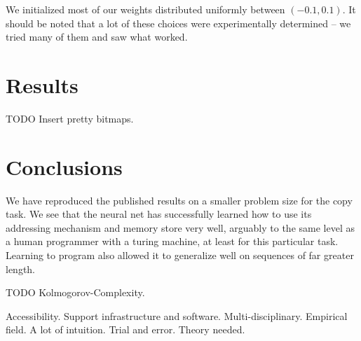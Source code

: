 \documentclass[12pt]{article}
\begin{document}
We initialized most of our weights distributed uniformly between $(-0.1, 0.1)$.
It should be noted that a lot of these choices were experimentally determined -- we 
tried many of them and saw what worked.

\section{Results}\label{results}

TODO Insert pretty bitmaps.

\section{Conclusions}\label{conclusions}

We have reproduced the published results on a smaller problem size for the
copy task. We see that the neural net has successfully learned how to
use its addressing mechanism and memory store very well, arguably to the
same level as a human programmer with a turing machine, at least for this
particular task. Learning to program also allowed it to generalize
well on sequences of far greater length.

TODO Kolmogorov-Complexity.

Accessibility. Support infrastructure and software. Multi-disciplinary.
Empirical field. A lot of intuition. Trial and error. Theory needed.



\end{document}
